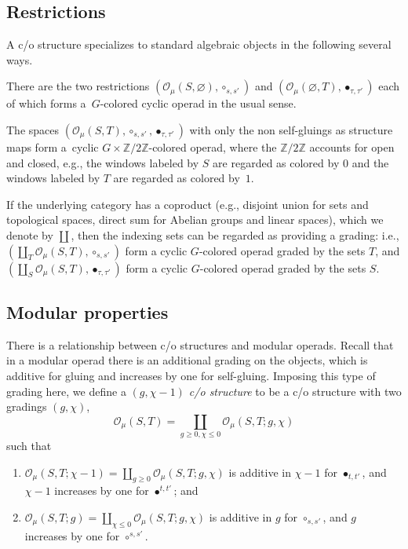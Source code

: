 \documentclass[pdftex]{sigma}
\def\CO{{\mathcal O_\mu}}
\def\t{\tau}
\def\Z{\mathbb Z}
\begin{document}
\subsection{Restrictions}
A c/o structure specializes to standard algebraic objects
in the following several ways.

There are the two restrictions
 $(\CO(S,\varnothing),\circ_{s,s'})$ and
 $(\CO(\varnothing,T),\bullet_{\t,\t'})$
each of which forms a~$G$-colored cyclic operad in the usual sense.


The spaces
$(\CO(S,T), \circ_{s,s'},\bullet_{\t,\t'})$ with only the non self-gluings as structure maps
form a~cyclic
$G\times \Z/2\Z$-colored operad, where the $\Z/2\Z$ accounts for
open and closed, e.g., the windows labeled by $S$ are
regarded as colored by $0$ and the windows labeled by $T$ are
regarded as colored by~$1$.

If the underlying category has a
coproduct (e.g., disjoint union for sets and topological
spaces, direct sum for Abelian groups and linear spaces), which we
denote by $\coprod$, then the indexing sets can be regarded as
providing a grading: i.e.,   $(\coprod_T
\CO(S,T),\circ_{s,s'})$ form a cyclic $G$-colored operad graded by
the sets $T$, and
$(\coprod_S\CO(S,T),\bullet_{\t,\t'})$ form a cyclic
$G$-colored operad graded by the sets $S$.

\subsection{Modular properties}
\label{modular}
There is a relationship between c/o structures and modular operads. Recall
that in a modular operad there is an additional grading on the
objects, which is additive for gluing and increases by one for
self-gluing. Imposing this type of grading here, we
def\/ine a {\it $(g,\chi -1)$ c/o structure} to be a c/o structure with
two gradings $(g,\chi)$,
\[
\CO(S,T)=\coprod_{g\geq 0,\chi
\leq 0} \CO(S,T;g,\chi)
\] such that
\begin{enumerate}
\item[(1)]
$\CO(S,T;\chi-1)=\coprod_{g\geq 0}\CO(S,T;g,\chi)$ is additive in
$\chi-1$ for $\bullet_{t,t'}$, and $\chi-1$ increases by one for
$\bullet^{t,t'}$; and

\item[(2)] $\CO(S,T;g)=\coprod_{\chi\leq
0}\CO(S,T;g,\chi)$ is additive in $g$ for $\circ_{s,s'}$, and $g$
increases by one for $\circ^{s,s'}$.
\end{enumerate}
\end{document}
